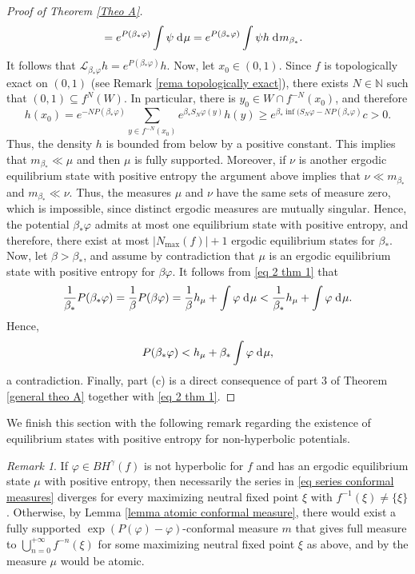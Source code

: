\documentclass[12pt]{amsart}
\numberwithin{equation}{section} %
\numberwithin{figure}{section} %
\theoremstyle{plain}
\theoremstyle{definition}
\theoremstyle{remark}
\newtheorem{rema}[prop]{Remark}
\theoremstyle{citing}
\newcommand{\N}{\mathbb{N}}
\renewcommand{\=}{\coloneqq}
\newcommand{\dd}{\hspace{1pt}\operatorname{d}\hspace{-1pt}}
\begin{document}
\begin{proof}[Proof of Theorem \ref{Theo A}]
\begin{equation*}
\begin{split}
        &= e^{P(\beta_*\varphi)}\int \psi \dd \mu = e^{P(\beta_*\varphi)}\int \psi h\dd m_{\beta_*}.
        \end{split}
    \end{equation*}
    It follows that $\mathcal{L}_{\beta_*\varphi}h=e^{P(\beta_*\varphi)}h$. Now, let $x_0\in(0,1)$. Since $f$ is topologically exact on $(0,1)$ (see Remark \ref{rema topologically exact}), there exists $N\in \N$ such that $(0,1)\subseteq f^N(W)$. In particular, there is $y_0\in W\cap f^{-{N}}(x_0)$, and therefore
    \begin{equation*}
        h(x_0)= e^{-NP(\beta_*\varphi)}\sum_{y\in f^{-N}(x_0)} e^{\beta_*S_N\varphi(y)}h(y) \geq e^{\beta_*\inf (S_N \varphi-NP(\beta_*
        \varphi)}c>0.
    \end{equation*}
    Thus, the density $h$ is bounded from below by a positive constant. This implies that $m_{\beta_*}\ll \mu$ and then $\mu$ is fully supported. Moreover, if $\nu$ is another ergodic equilibrium state with positive entropy the argument above implies that $\nu\ll m_{\beta_*}$ and $m_{\beta_*}\ll \nu$. Thus, the measures $\mu$ and $\nu$ have the same sets of measure zero, which is impossible, since distinct ergodic measures are mutually singular. Hence, the potential $\beta_*\varphi$ admits at most one equilibrium state with positive entropy, and therefore, there exist at most $|N_{\max}(f)| + 1$ ergodic equilibrium states for $\beta_*$. Now, let $\beta>\beta_*$, and assume by contradiction that $\mu$ is an ergodic equilibrium state with positive entropy for $\beta\varphi$. It follows from \eqref{eq 2 thm 1} that
    \begin{equation*}
        \frac{1}{\beta_*}P(\beta_* \varphi) = \frac{1}{\beta}P(\beta\varphi) = \frac{1}{\beta}h_{\mu} + \int \varphi \dd\mu < \frac{1}{\beta_*}h_\mu + \int \varphi \dd\mu.
    \end{equation*}
    Hence,
    \begin{equation*}
        P(\beta_*\varphi) < h_\mu + \beta_* \int\varphi \dd\mu,
    \end{equation*}
    a contradiction.
    Finally, part (c) is a direct consequence of part 3 of Theorem \ref{general theo A} together with \eqref{eq 2 thm 1}.
\end{proof}
We finish this section with the following remark regarding the existence of equilibrium states with positive entropy for non-hyperbolic potentials.

\begin{rema}
    If $\varphi \in BH^{\gamma}(f)$ is not hyperbolic for $f$ and has an ergodic equilibrium state $\mu$ with positive entropy, then necessarily the series in \eqref{eq series conformal measures} diverges for every maximizing neutral fixed point $\xi$ with $f^{-1}(\xi)\neq \{\xi\}$. Otherwise, by Lemma \ref{lemma atomic conformal measure}, there would exist a fully supported $\exp(P(\varphi)-\varphi)$-conformal measure $m$ that gives full measure to $\bigcup_{n=0}^{+\infty}f^{-n}(\xi)$ for some maximizing neutral fixed point $\xi$ as above, and by \cite[Theorem 6]{Dobbs} the measure $\mu$ would be atomic.
\end{rema}
\end{document}
